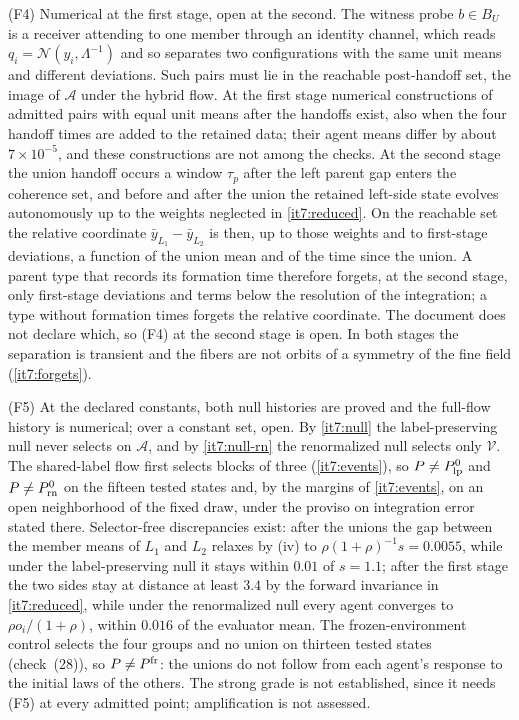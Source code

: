\documentclass[11pt,letterpaper]{report}
\begin{document}
(F4) Numerical at the first stage, open at the second. The witness probe $b\in B_U$ is a receiver attending to one member through an identity channel, which reads $q_i=\mathcal N(y_i,\Lambda^{-1})$ and so separates two configurations with the same unit means and different deviations. Such pairs must lie in the reachable post-handoff set, the image of $\mathcal A$ under the hybrid flow. At the first stage numerical constructions of admitted pairs with equal unit means after the handoffs exist, also when the four handoff times are added to the retained data; their agent means differ by about $7\times10^{-5}$, and these constructions are not among the checks. At the second stage the union handoff occurs a window $\tau_p$ after the left parent gap enters the coherence set, and before and after the union the retained left-side state evolves autonomously up to the weights neglected in \cref{it7:reduced}. On the reachable set the relative coordinate $\bar y_{L_1}-\bar y_{L_2}$ is then, up to those weights and to first-stage deviations, a function of the union mean and of the time since the union. A parent type that records its formation time therefore forgets, at the second stage, only first-stage deviations and terms below the resolution of the integration; a type without formation times forgets the relative coordinate. The document does not declare which, so (F4) at the second stage is open. In both stages the separation is transient and the fibers are not orbits of a symmetry of the fine field (\cref{it7:forgets}).

(F5) At the declared constants, both null histories are proved and the full-flow history is numerical; over a constant set, open. By \cref{it7:null} the label-preserving null never selects on $\mathcal A$, and by \cref{it7:null-rn} the renormalized null selects only $\mathcal V$. The shared-label flow first selects blocks of three (\cref{it7:events}), so $P\ne P^0_{\rm lp}$ and $P\ne P^0_{\rm rn}$ on the fifteen tested states and, by the margins of \cref{it7:events}, on an open neighborhood of the fixed draw, under the proviso on integration error stated there. Selector-free discrepancies exist: after the unions the gap between the member means of $L_1$ and $L_2$ relaxes by (iv) to $\rho(1+\rho)^{-1}s=0.0055$, while under the label-preserving null it stays within $0.01$ of $s=1.1$; after the first stage the two sides stay at distance at least $3.4$ by the forward invariance in \cref{it7:reduced}, while under the renormalized null every agent converges to $\rho o_i/(1+\rho)$, within $0.016$ of the evaluator mean. The frozen-environment control selects the four groups and no union on thirteen tested states (check~(28)), so $P\ne P^{\rm fr}$: the unions do not follow from each agent's response to the initial laws of the others. The strong grade is not established, since it needs (F5) at every admitted point; amplification is not assessed.
\end{document}
